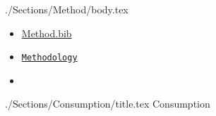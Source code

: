\documentclass{\econtex}\newcommand{\texname}{Syllabus}
\begin{document}
\begin{verbatimwrite}{./Sections/Method/body.tex}

\begin{itemize}
\item[Bib:] \href{http://www.econ2.jhu.edu/people/ccarroll/courses/choice/Syllabus/Method.bib}{Method.bib}
\item[Handouts:]  \texttt{\href{https://www.econ2.jhu.edu/people/ccarroll/Public/Lecturenotes/CourseIntro/Methodology}{Methodology}}
\item[Readings:]
\end{itemize}


\begin{itemize} 
\reqd \cite{summersIllusion}  
\reqd \cite{acemogluCrisis}   
\reqd \cite{krugmanHistory}   
\reqd \cite{caballeroPretense}
\reqd \cite{barberaFight}     
\reqd \cite{romerTrouble}
\end{itemize}

\end{verbatimwrite}



\begin{verbatimwrite}{./Sections/Consumption/title.tex}
Consumption
\end{verbatimwrite}
\end{document}
